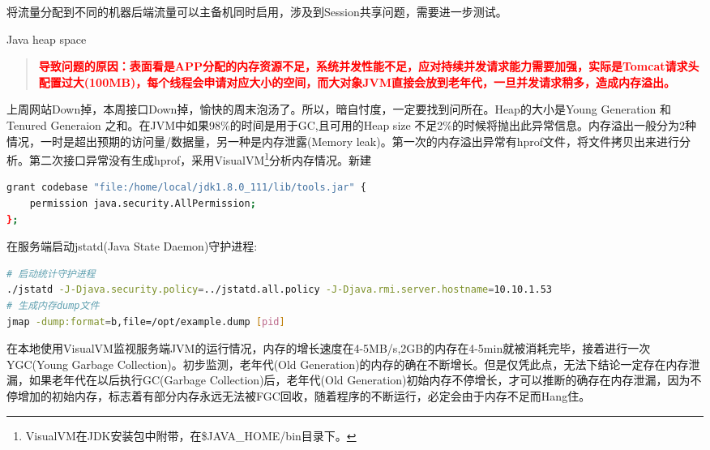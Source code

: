 \documentclass[8pt]{book}
\makeatletter
\numberwithin{dummy}{section}
\theoremstyle{ocrenumbox}
\theoremstyle{blacknumex}
\theoremstyle{blacknumbox}
\theoremstyle{ocrenum}
\renewcommand{\subsection}{\@startsection {subsection}{2}{\z@}
	{-3ex \@plus -0.1ex \@minus -.4ex}
	{0.5ex \@plus.2ex }
	{\normalfont\sffamily\bfseries}}
\renewcommand\paragraph{\@startsection{paragraph}{4}{\z@}
	{-2ex \@plus-.2ex \@minus .2ex}
	{.1ex}
	{\normalfont\small\sffamily\bfseries}}
\makeatother
\begin{document}
\paragraph{将流量分配到不同的机器}后端流量可以主备机同时启用，涉及到Session共享问题，需要进一步测试。




\subsection{Java heap space}

\begin{quote}
	\textbf{\textcolor{red}{导致问题的原因：表面看是APP分配的内存资源不足，系统并发性能不足，应对持续并发请求能力需要加强，实际是Tomcat请求头配置过大(100MB)，每个线程会申请对应大小的空间，而大对象JVM直接会放到老年代，一旦并发请求稍多，造成内存溢出。}}
\end{quote}

上周网站Down掉，本周接口Down掉，愉快的周末泡汤了。所以，暗自忖度，一定要找到问所在。Heap的大小是Young Generation 和Tenured Generaion 之和。在JVM中如果98\%的时间是用于GC,且可用的Heap size 不足2\%的时候将抛出此异常信息。内存溢出一般分为2种情况，一时是超出预期的访问量/数据量，另一种是内存泄露(Memory leak)。第一次的内存溢出异常有hprof文件，将文件拷贝出来进行分析。第二次接口异常没有生成hprof，采用VisualVM\footnote{VisualVM在JDK安装包中附带，在\$JAVA\_HOME/bin目录下。}分析内存情况。新建

\begin{lstlisting}[language=Bash]
grant codebase "file:/home/local/jdk1.8.0_111/lib/tools.jar" {   
	permission java.security.AllPermission;   
};
\end{lstlisting}

在服务端启动jstatd(Java State Daemon)守护进程:

\begin{lstlisting}[language=Bash]
# 启动统计守护进程
./jstatd -J-Djava.security.policy=../jstatd.all.policy -J-Djava.rmi.server.hostname=10.10.1.53
# 生成内存dump文件
jmap -dump:format=b,file=/opt/example.dump [pid]
\end{lstlisting}

在本地使用VisualVM监视服务端JVM的运行情况，内存的增长速度在4-5MB/s,2GB的内存在4-5min就被消耗完毕，接着进行一次YGC(Young Garbage Collection)。初步监测，老年代(Old Generation)的内存的确在不断增长。但是仅凭此点，无法下结论一定存在内存泄漏，如果老年代在以后执行GC(Garbage Collection)后，老年代(Old Generation)初始内存不停增长，才可以推断的确存在内存泄漏，因为不停增加的初始内存，标志着有部分内存永远无法被FGC回收，随着程序的不断运行，必定会由于内存不足而Hang住。
\end{document}
